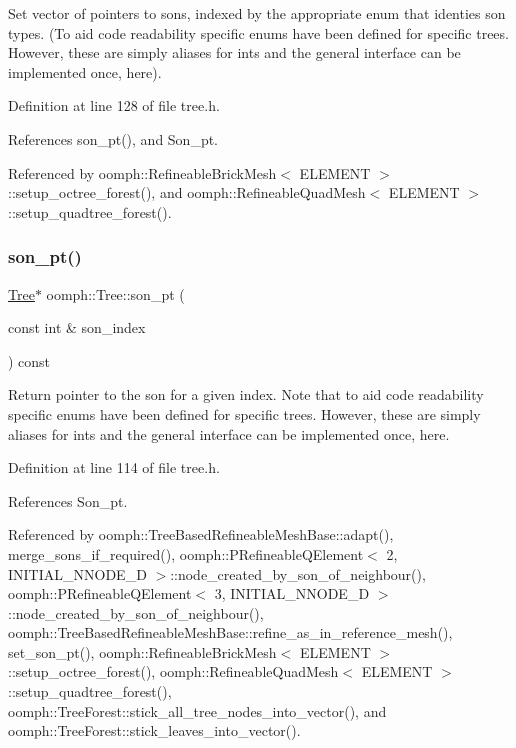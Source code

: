 Set vector of pointers to sons, indexed by the appropriate enum that identies son types. (To aid code readability specific enums have been defined for specific trees. However, these are simply aliases for ints and the general interface can be implemented once, here). 



Definition at line 128 of file tree.\+h.



References son\+\_\+pt(), and Son\+\_\+pt.



Referenced by oomph\+::\+Refineable\+Brick\+Mesh$<$ E\+L\+E\+M\+E\+N\+T $>$\+::setup\+\_\+octree\+\_\+forest(), and oomph\+::\+Refineable\+Quad\+Mesh$<$ E\+L\+E\+M\+E\+N\+T $>$\+::setup\+\_\+quadtree\+\_\+forest().

\mbox{\label{classoomph_1_1Tree_ab2ca6416d7a368e29da6a6a998f460c7}} 
\subsubsection{\texorpdfstring{son\+\_\+pt()}{son\_pt()}}
{\footnotesize\ttfamily \hyperlink{classoomph_1_1Tree}{Tree}$\ast$ oomph\+::\+Tree\+::son\+\_\+pt (\begin{DoxyParamCaption}\item[{const int \&}]{son\+\_\+index }\end{DoxyParamCaption}) const\hspace{0.3cm}{\ttfamily [inline]}}



Return pointer to the son for a given index. Note that to aid code readability specific enums have been defined for specific trees. However, these are simply aliases for ints and the general interface can be implemented once, here. 



Definition at line 114 of file tree.\+h.



References Son\+\_\+pt.



Referenced by oomph\+::\+Tree\+Based\+Refineable\+Mesh\+Base\+::adapt(), merge\+\_\+sons\+\_\+if\+\_\+required(), oomph\+::\+P\+Refineable\+Q\+Element$<$ 2, I\+N\+I\+T\+I\+A\+L\+\_\+\+N\+N\+O\+D\+E\+\_\+D $>$\+::node\+\_\+created\+\_\+by\+\_\+son\+\_\+of\+\_\+neighbour(), oomph\+::\+P\+Refineable\+Q\+Element$<$ 3, I\+N\+I\+T\+I\+A\+L\+\_\+\+N\+N\+O\+D\+E\+\_\+D $>$\+::node\+\_\+created\+\_\+by\+\_\+son\+\_\+of\+\_\+neighbour(), oomph\+::\+Tree\+Based\+Refineable\+Mesh\+Base\+::refine\+\_\+as\+\_\+in\+\_\+reference\+\_\+mesh(), set\+\_\+son\+\_\+pt(), oomph\+::\+Refineable\+Brick\+Mesh$<$ E\+L\+E\+M\+E\+N\+T $>$\+::setup\+\_\+octree\+\_\+forest(), oomph\+::\+Refineable\+Quad\+Mesh$<$ E\+L\+E\+M\+E\+N\+T $>$\+::setup\+\_\+quadtree\+\_\+forest(), oomph\+::\+Tree\+Forest\+::stick\+\_\+all\+\_\+tree\+\_\+nodes\+\_\+into\+\_\+vector(), and oomph\+::\+Tree\+Forest\+::stick\+\_\+leaves\+\_\+into\+\_\+vector().

